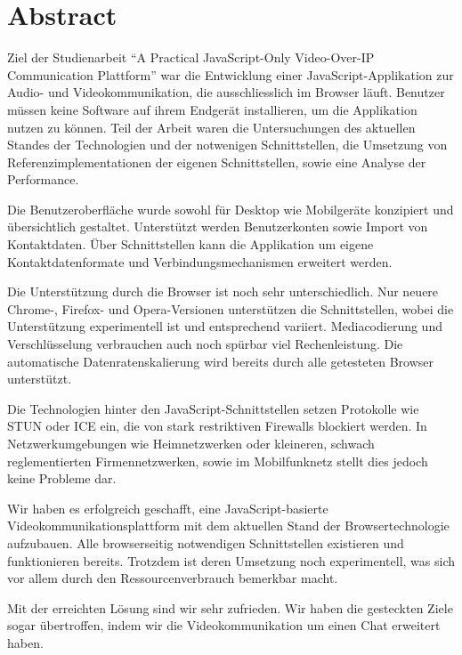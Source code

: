 \chapter{Abstract}

Ziel der Studienarbeit "`A Practical JavaScript-Only Video-Over-IP
Communication Plattform"' war die Entwicklung einer JavaScript-Applikation zur Audio- und Videokommunikation, die ausschliesslich im Browser läuft. Benutzer müssen keine Software auf ihrem Endgerät installieren, um die Applikation nutzen zu können.
Teil der Arbeit waren die Untersuchungen des aktuellen Standes der Technologien
und der notwenigen Schnittstellen, die Umsetzung von Referenzimplementationen
der eigenen Schnittstellen, sowie eine Analyse der Performance.

Die Benutzeroberfläche wurde sowohl für Desktop wie Mobilgeräte konzipiert und übersichtlich gestaltet. Unterstützt werden Benutzerkonten sowie Import von Kontaktdaten.
Über Schnittstellen kann die Applikation um eigene Kontaktdatenformate und Verbindungsmechanismen erweitert werden.

Die Unterstützung durch die Browser ist noch sehr unterschiedlich. Nur neuere Chrome-, Firefox- und Opera-Versionen unterstützen die Schnittstellen, wobei die Unterstützung experimentell ist und entsprechend variiert. Mediacodierung und Verschlüsselung verbrauchen auch noch spürbar viel Rechenleistung. Die automatische Datenratenskalierung wird bereits durch alle getesteten Browser unterstützt.

Die Technologien hinter den JavaScript-Schnittstellen setzen Protokolle wie STUN
oder ICE ein, die von stark restriktiven Firewalls blockiert werden. In
Netzwerkumgebungen wie Heimnetzwerken oder kleineren, schwach reglementierten Firmennetzwerken, sowie im Mobilfunknetz stellt dies jedoch keine Probleme dar.

Wir haben es erfolgreich geschafft, eine JavaScript-basierte
Videokommunikationsplattform mit dem aktuellen Stand der Browsertechnologie aufzubauen. Alle browserseitig notwendigen Schnittstellen existieren und funktionieren bereits. Trotzdem ist deren Umsetzung noch experimentell, was sich vor allem durch den Ressourcenverbrauch bemerkbar macht.

Mit der erreichten Lösung sind wir sehr zufrieden. Wir haben die gesteckten
Ziele sogar übertroffen, indem wir die Videokommunikation um einen Chat erweitert haben.
